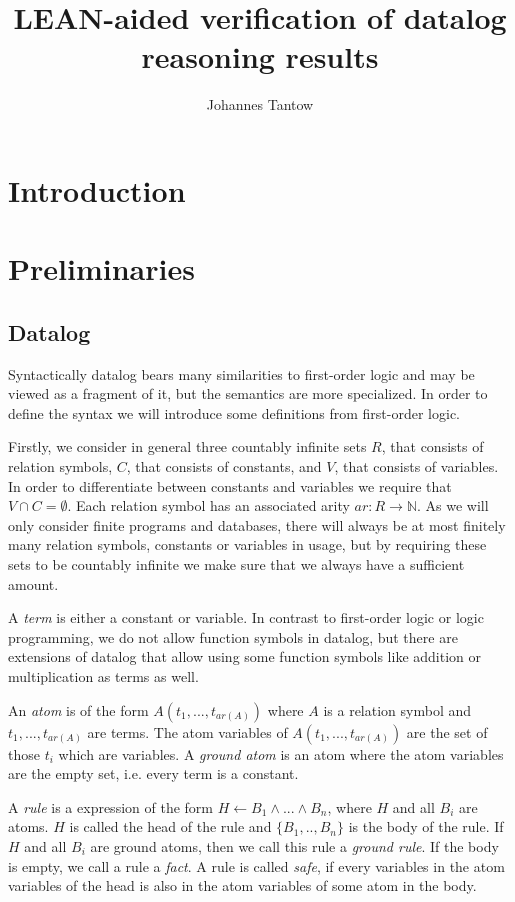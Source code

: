 \documentclass{article}
\title{LEAN-aided verification of datalog reasoning results}
\author{Johannes Tantow}
\begin{document}
    \maketitle
    \section{Introduction}
    \section{Preliminaries}
    \subsection{Datalog}
        Syntactically datalog bears many similarities to first-order logic and may be viewed as a fragment of it, but the semantics are more specialized. In order to define the syntax we will introduce some definitions from first-order logic.

        Firstly, we consider in general three countably infinite sets $R$, that consists of relation symbols, $C$, that consists of constants, and $V$, that consists of variables. In order to differentiate between constants and variables we require that $V \cap C  = \emptyset$. Each relation symbol has an associated arity $ar: R \to \mathbb{N}$. As we will only consider finite programs and databases, there will always be at most finitely many relation symbols, constants or variables in usage, but by requiring these sets to be countably infinite we make sure that we always have a sufficient amount. 
        
        A \textit{term} is either a constant or variable. In contrast to first-order logic or logic programming, we do not allow function symbols in datalog, but there are extensions of datalog that allow using some function symbols like addition or multiplication as terms as well.

        An \textit{atom} is of the form $A(t_1, ..., t_{ar(A)})$ where $A$ is a relation symbol and $t_1,..., t_{ar(A)}$ are terms. The atom variables of $A(t_1, ..., t_{ar(A)})$ are the set of those $t_i$ which are variables. A \textit{ground atom} is an atom where the atom variables are the empty set, i.e. every term is a constant.
        
        A \textit{rule} is a expression of the form $H \leftarrow B_1 \land ... \land B_n$, where $H$ and all $B_i$ are atoms. $H$ is called the head of the rule and $\{B_1,.., B_n\}$ is the body of the rule. If $H$ and all $B_i$ are ground atoms, then we call this rule a \textit{ground rule}. If the body is empty, we call a rule a \textit{fact}. A rule is called \textit{safe}, if every variables in the atom variables of the head is also in the atom variables of some atom in the body. 
\end{document}
